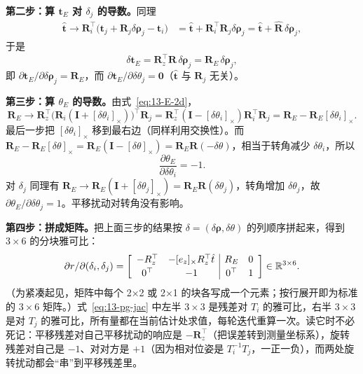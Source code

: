 \textbf{第二步：算 $\bm{t}_E$ 对 $\delta_j$ 的导数。}同理
\begin{align}
\hat{\bm{t}}\to\bm{R}_i^{\top}\big(\bm{t}_j+\bm{R}_j\delta\bm{\rho}_j-\bm{t}_i\big)
&=\hat{\bm{t}}+\bm{R}_i^{\top}\bm{R}_j\delta\bm{\rho}_j
=\hat{\bm{t}}+\hat{\bm{R}}\,\delta\bm{\rho}_j,
\end{align}
于是
\begin{equation}
\delta\bm{t}_E=\bm{R}_z^{\top}\hat{\bm{R}}\,\delta\bm{\rho}_j=\bm{R}_E\,\delta\bm{\rho}_j,
\end{equation}
即 $\partial\bm{t}_E/\partial\delta\bm{\rho}_j=\bm{R}_E$，而 $\partial\bm{t}_E/\partial\delta\theta_j=\bm{0}$（$\hat{\bm{t}}$ 与 $\bm{R}_j$ 无关）。

\textbf{第三步：算 $\theta_E$ 的导数。}由式~\eqref{eq:13-E-2d}，
\begin{equation}
\bm{R}_E\to\bm{R}_z^{\top}\big(\bm{R}_i(\bm{I}+[\delta\theta_i]_\times)\big)^{\top}\bm{R}_j
=\bm{R}_z^{\top}(\bm{I}-[\delta\theta_i]_\times)\bm{R}_i^{\top}\bm{R}_j
=\bm{R}_E-\bm{R}_E[\delta\theta_i]_\times .
\end{equation}
最后一步把 $[\delta\theta_i]_\times$ 移到最右边（同样利用交换性）。而 $\bm{R}_E-\bm{R}_E[\delta\theta]_\times=\bm{R}_E(\bm{I}-[\delta\theta]_\times)=\bm{R}_E\bm{R}(-\delta\theta)$，相当于转角减少 $\delta\theta_i$，所以
\begin{equation}
\frac{\partial\theta_E}{\partial\delta\theta_i}=-1 .
\end{equation}
对 $\delta_j$ 同理有 $\bm{R}_E\to\bm{R}_E(\bm{I}+[\delta\theta_j]_\times)=\bm{R}_E\bm{R}(\delta\theta_j)$，转角增加 $\delta\theta_j$，故 $\partial\theta_E/\partial\delta\theta_j=1$。平移扰动对转角没有影响。

\textbf{第四步：拼成矩阵。}把上面三步的结果按 $\delta=(\delta\bm{\rho},\delta\theta)$ 的列顺序拼起来，得到 $3\times6$ 的分块雅可比：
\begin{equation}
\partial r/\partial(\delta_i,\delta_j)=
\left[
\begin{array}{cc|cc}
-R_z^{\top} & -[e_z]_\times R_z^{\top}\hat{t} & R_E & 0\\[2pt]
0^{\top} & -1 & 0^{\top} & 1
\end{array}
\right]\in\mathbb{R}^{3\times6}.
\label{eq:13-pg-jac}
\end{equation}
（为紧凑起见，矩阵中每个 2×2 或 2×1 的块各写成一个元素；按行展开即为标准的 $3\times6$ 矩阵。）式~\eqref{eq:13-pg-jac} 中左半 $3\times3$ 是残差对 $T_i$ 的雅可比，右半 $3\times3$ 是对 $T_j$ 的雅可比，所有量都在当前估计处求值，每轮迭代重算一次。读它时不必死记：平移残差对自己平移扰动的响应是 $-\bm{R}_z^{\top}$（把误差转到测量坐标系），旋转残差对自己是 $-1$、对对方是 $+1$（因为相对位姿是 $T_i^{-1}T_j$，一正一负），而两处旋转扰动都会``串''到平移残差里。

